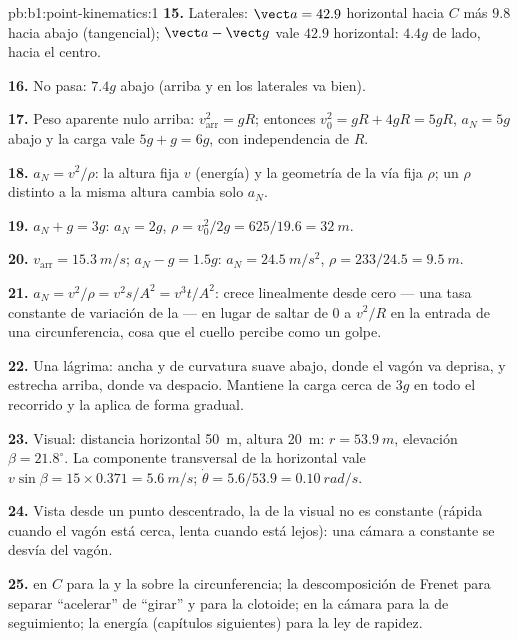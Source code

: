 \begin{solution}{pb:b1:point-kinematics:1}
\textbf{15.} Laterales: $\vect a = 42.9$ horizontal hacia $C$ más $9.8$
hacia abajo (tangencial); $\vect a - \vect g$ vale $42.9$ horizontal:
$4.4g$ de lado, hacia el centro.

\textbf{16.} No pasa: $7.4g$ abajo (arriba y en los laterales va bien).

\textbf{17.} Peso aparente nulo arriba: $v_{\text{arr}}^2 = gR$; entonces
$v_0^2 = gR + 4gR = 5gR$, $a_N = 5g$ abajo y la carga vale
$5g + g = 6g$, con independencia de $R$.

\textbf{18.} $a_N = v^2/\rho$: la altura fija $v$ (energía) y la geometría
de la vía fija $\rho$; un $\rho$ distinto a la misma altura cambia solo
$a_N$.

\textbf{19.} $a_N + g = 3g$: $a_N = 2g$, $\rho = v_0^2/2g = 625/19.6 =
\qty{32}{m}$.

\textbf{20.} $v_{\text{arr}} = \qty{15.3}{m/s}$; $a_N - g = 1.5g$: $a_N =
\qty{24.5}{m/s^2}$, $\rho = 233/24.5 = \qty{9.5}{m}$.

\textbf{21.} $a_N = v^2/\rho = v^2s/A^2 = v^3t/A^2$: crece linealmente
desde cero --- una tasa constante de variación de la  --- en
lugar de saltar de $0$ a $v^2/R$ en la entrada de una circunferencia, cosa
que el cuello percibe como un golpe.

\textbf{22.} Una lágrima: ancha y de curvatura suave abajo, donde el vagón
va deprisa, y estrecha arriba, donde va despacio. Mantiene la carga cerca
de $3g$ en todo el recorrido y la aplica de forma gradual.

\textbf{23.} Visual: distancia horizontal \qty{50}{m}, altura
\qty{20}{m}: $r = \qty{53.9}{m}$, elevación $\beta = 21.8^\circ$. La
componente transversal de la  horizontal vale $v\sin\beta = 15 \times
0.371 = \qty{5.6}{m/s}$; $\dot\theta = 5.6/53.9 = \qty{0.10}{rad/s}$.

\textbf{24.} Vista desde un punto descentrado, la  de la
visual no es constante (rápida cuando el vagón está cerca, lenta cuando
está lejos): una cámara a  constante se desvía del vagón.

\textbf{25.}  en $C$ para la  y la 
sobre la circunferencia; la descomposición de Frenet para separar
``acelerar'' de ``girar'' y para la clotoide;  en la
cámara para la  de seguimiento; la energía (capítulos
siguientes) para la ley de rapidez.
\end{solution}
